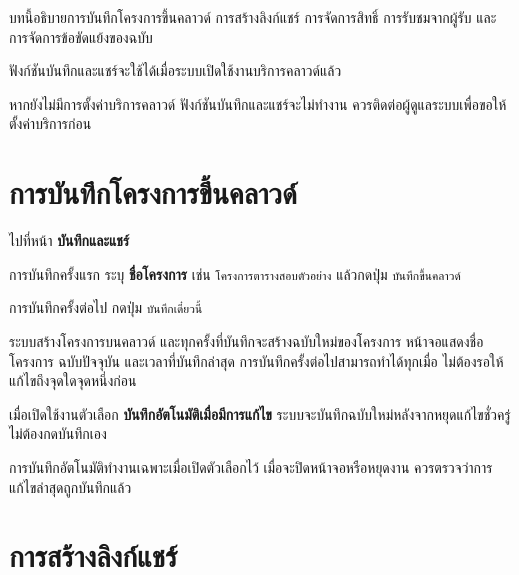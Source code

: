 
\noindent บทนี้อธิบายการบันทึกโครงการขึ้นคลาวด์ การสร้างลิงก์แชร์ การจัดการสิทธิ์
การรับชมจากผู้รับ และการจัดการข้อขัดแย้งของฉบับ

ฟังก์ชันบันทึกและแชร์จะใช้ได้เมื่อระบบเปิดใช้งานบริการคลาวด์แล้ว

\begin{caution}
หากยังไม่มีการตั้งค่าบริการคลาวด์ ฟังก์ชันบันทึกและแชร์จะไม่ทำงาน
ควรติดต่อผู้ดูแลระบบเพื่อขอให้ตั้งค่าบริการก่อน
\end{caution}

\section{การบันทึกโครงการขึ้นคลาวด์}

\begin{steps}
  \item ไปที่หน้า \textbf{บันทึกและแชร์}
  \item การบันทึกครั้งแรก ระบุ \textbf{ชื่อโครงการ} เช่น
        \texttt{โครงการตารางสอบตัวอย่าง} แล้วกดปุ่ม \texttt{บันทึกขึ้นคลาวด์}
  \item การบันทึกครั้งต่อไป กดปุ่ม \texttt{บันทึกเดี๋ยวนี้}
\end{steps}

\begin{expected}
ระบบสร้างโครงการบนคลาวด์ และทุกครั้งที่บันทึกจะสร้างฉบับใหม่ของโครงการ
หน้าจอแสดงชื่อโครงการ ฉบับปัจจุบัน และเวลาที่บันทึกล่าสุด
การบันทึกครั้งต่อไปสามารถทำได้ทุกเมื่อ ไม่ต้องรอให้แก้ไขถึงจุดใดจุดหนึ่งก่อน
\end{expected}


เมื่อเปิดใช้งานตัวเลือก \textbf{บันทึกอัตโนมัติเมื่อมีการแก้ไข}
ระบบจะบันทึกฉบับใหม่หลังจากหยุดแก้ไขชั่วครู่ ไม่ต้องกดบันทึกเอง

\begin{note}
การบันทึกอัตโนมัติทำงานเฉพาะเมื่อเปิดตัวเลือกไว้
เมื่อจะปิดหน้าจอหรือหยุดงาน ควรตรวจว่าการแก้ไขล่าสุดถูกบันทึกแล้ว
\end{note}

\section{การสร้างลิงก์แชร์}

